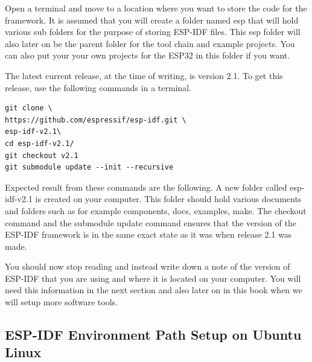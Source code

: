 \documentclass{tufte-book}
\begin{document}
Open a terminal and move to a location where you want to store the code for the framework. It is assumed that you will create a folder named esp that will hold various sub folders for the purpose of storing ESP-IDF files. This esp folder will also later on be the parent folder for the tool chain and example projects. You can also put your your own projects for the ESP32 in this folder if you want.


The latest current release, at the time of writing, is version 2.1. To get this release, use the following commands in a terminal.

\begin{lstlisting}
git clone \
https://github.com/espressif/esp-idf.git \
esp-idf-v2.1\ 
cd esp-idf-v2.1/
git checkout v2.1
git submodule update --init --recursive
\end{lstlisting}


Expected result from these commands are the following. A new folder called esp-idf-v2.1 is created on your computer. This folder should hold various documents and folders such as for example components, docs, examples, make. The checkout command and the submodule update command ensures that the version of the ESP-IDF framework is in the same exact state as it was when release 2.1 was made.

You should now stop reading and instead write down a note of the version of ESP-IDF that you are using and where it is located on your computer. You will need this information in the next section and also later on in this book when we will setup more software tools.

\subsection{ESP-IDF Environment Path Setup on Ubuntu Linux}
\end{document}

